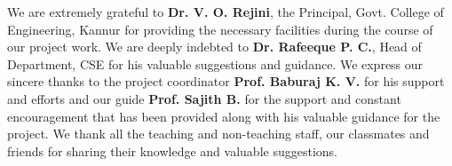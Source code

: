 We are extremely grateful to \textbf{Dr. V. O. Rejini}, the Principal, Govt. College
of Engineering, Kannur for providing the necessary facilities during the course
of our project work. We are deeply indebted to \textbf{Dr. Rafeeque P. C.}, Head
of Department, CSE for his valuable suggestions and guidance. We express
our sincere thanks to the project coordinator \textbf{Prof. Baburaj K. V.} for his support
and efforts and our guide \textbf{Prof. Sajith B.} for the support and constant encouragement that has been provided
along with his valuable guidance for the project. We thank all the teaching and
non-teaching staff, our classmates and friends for sharing their knowledge and
valuable suggestions.